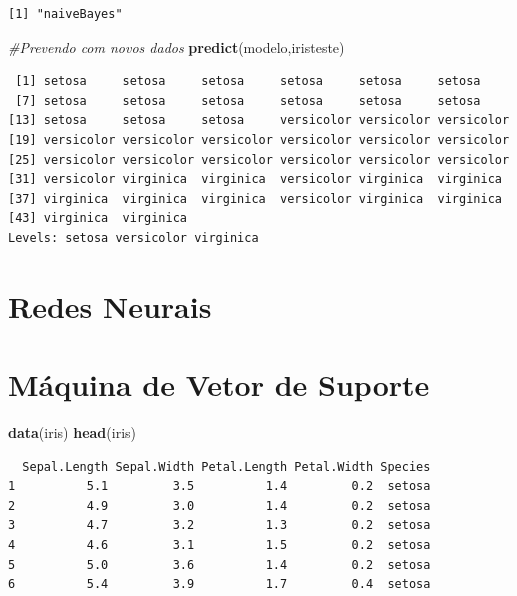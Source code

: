 \documentclass[12pt,brazil,oneside]{book}
\newenvironment{Shaded}{\begin{snugshade}}{\end{snugshade}}
\newcommand{\CommentTok}[1]{\textcolor[rgb]{0.56,0.35,0.01}{\textit{#1}}}
\newcommand{\KeywordTok}[1]{\textcolor[rgb]{0.13,0.29,0.53}{\textbf{#1}}}
\newcommand{\NormalTok}[1]{#1}
\begin{document}
\begin{verbatim}
[1] "naiveBayes"
\end{verbatim}

\begin{Shaded}
\begin{Highlighting}[]
\CommentTok{#Prevendo com novos dados}
\KeywordTok{predict}\NormalTok{(modelo,iristeste)}
\end{Highlighting}
\end{Shaded}

\begin{verbatim}
 [1] setosa     setosa     setosa     setosa     setosa     setosa    
 [7] setosa     setosa     setosa     setosa     setosa     setosa    
[13] setosa     setosa     setosa     versicolor versicolor versicolor
[19] versicolor versicolor versicolor versicolor versicolor versicolor
[25] versicolor versicolor versicolor versicolor versicolor versicolor
[31] versicolor virginica  virginica  versicolor virginica  virginica 
[37] virginica  virginica  virginica  versicolor virginica  virginica 
[43] virginica  virginica 
Levels: setosa versicolor virginica
\end{verbatim}

\hypertarget{redes-neurais}{%
\section{Redes Neurais}\label{redes-neurais}}

\hypertarget{maquina-de-vetor-de-suporte}{%
\section{Máquina de Vetor de Suporte}\label{maquina-de-vetor-de-suporte}}

\begin{Shaded}
\begin{Highlighting}[]
\KeywordTok{data}\NormalTok{(iris)}
\KeywordTok{head}\NormalTok{(iris)}
\end{Highlighting}
\end{Shaded}

\begin{verbatim}
  Sepal.Length Sepal.Width Petal.Length Petal.Width Species
1          5.1         3.5          1.4         0.2  setosa
2          4.9         3.0          1.4         0.2  setosa
3          4.7         3.2          1.3         0.2  setosa
4          4.6         3.1          1.5         0.2  setosa
5          5.0         3.6          1.4         0.2  setosa
6          5.4         3.9          1.7         0.4  setosa
\end{verbatim}
\end{document}
